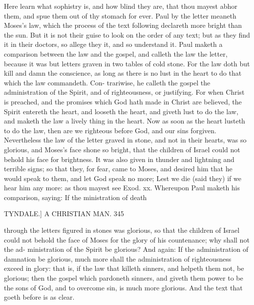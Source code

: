 \documentclass{custom}
\begin{document}
{Here learn what sophistry is, and how blind they are, 
that thou mayest abhor them, and spue them out of thy 
stomach for ever. Paul by the letter meaneth Moses's 
law, which the process of the text following declareth 
more bright than the sun. But it is not their guise to 
look on the order of any text; but as they find it in their 
doctors, so allege they it, and so understand it. Paul 
maketh a comparison between the law and the gospel, 
and calleth the law the letter, because it was but letters 
graven in two tables of cold stone. For the law doth but 
kill and damn the conscience, as long as there is no lust 
in the heart to do that which the law commandeth. Con- 
trariwise, he calleth the gospel the administration of the 
Spirit, and of righteousness, or justifying. For when 
Christ is preached, and the promises which God hath 
made in Christ are believed, the Spirit entereth the heart, 
and looseth the heart, and giveth lust to do the law, and 
maketh the law a lively thing in the heart. Now as soon 
as the heart lusteth to do the law, then are we righteous 
before God, and our sins forgiven. Nevertheless the law 
of the letter graved in stone, and not in their hearts, was 
so glorious, and Moses's face shone so bright, that the 
children of Israel could not behold his face for brightness. 
It was also given in thunder and lightning and terrible 
signs; so that they, for fear, came to Moses, and desired 
him that he would speak to them, and let God speak no 
more; Lest we die (said they) if we hear him any more: 
as thou mayest see Exod. xx. Whereupon Paul maketh 
his comparison, saying: If the ministration of death 


TYNDALE.] A CHRISTIAN MAN. 345 

through the letters figured in stones was glorious, so that 
the children of Israel could not behold the face of Moses 
for the glory of his countenance; why shall not the ad- 
ministration of the Spirit be glorious? And again: If 
the administration of damnation be glorious, much more 
shall the administration of righteousness exceed in glory: 
that is, if the law that killeth sinners, and helpeth them 
not, be glorious; then the gospel which pardoneth 
sinners, and giveth them power to be the sons of God, 
and to overcome sin, is much more glorious. And the 
text that goeth before is as clear. 

}
\end{document}
